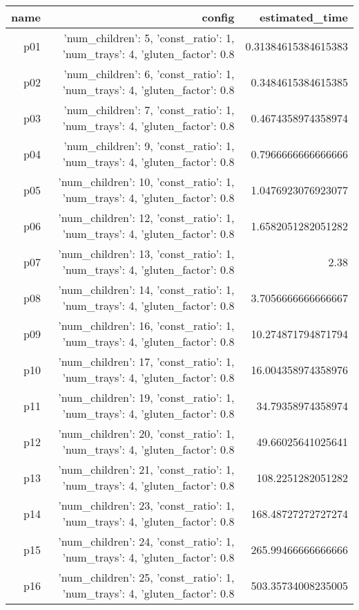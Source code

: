 \documentclass{article}
\begin{document}
                            \begin{center}
                            \scriptsize
                            \begin{tabular}{r|r|r}
                            name & config & estimated\_time\\\midrule
                              p01&{'num\_children': 5, 'const\_ratio': 1, 'num\_trays': 4, 'gluten\_factor': 0.8}&0.31384615384615383\\
  p02&{'num\_children': 6, 'const\_ratio': 1, 'num\_trays': 4, 'gluten\_factor': 0.8}&0.3484615384615385\\
  p03&{'num\_children': 7, 'const\_ratio': 1, 'num\_trays': 4, 'gluten\_factor': 0.8}&0.4674358974358974\\
  p04&{'num\_children': 9, 'const\_ratio': 1, 'num\_trays': 4, 'gluten\_factor': 0.8}&0.7966666666666666\\
  p05&{'num\_children': 10, 'const\_ratio': 1, 'num\_trays': 4, 'gluten\_factor': 0.8}&1.0476923076923077\\
  p06&{'num\_children': 12, 'const\_ratio': 1, 'num\_trays': 4, 'gluten\_factor': 0.8}&1.6582051282051282\\
  p07&{'num\_children': 13, 'const\_ratio': 1, 'num\_trays': 4, 'gluten\_factor': 0.8}&2.38\\
  p08&{'num\_children': 14, 'const\_ratio': 1, 'num\_trays': 4, 'gluten\_factor': 0.8}&3.7056666666666667\\
  p09&{'num\_children': 16, 'const\_ratio': 1, 'num\_trays': 4, 'gluten\_factor': 0.8}&10.274871794871794\\
  p10&{'num\_children': 17, 'const\_ratio': 1, 'num\_trays': 4, 'gluten\_factor': 0.8}&16.004358974358976\\
  p11&{'num\_children': 19, 'const\_ratio': 1, 'num\_trays': 4, 'gluten\_factor': 0.8}&34.79358974358974\\
  p12&{'num\_children': 20, 'const\_ratio': 1, 'num\_trays': 4, 'gluten\_factor': 0.8}&49.66025641025641\\
  p13&{'num\_children': 21, 'const\_ratio': 1, 'num\_trays': 4, 'gluten\_factor': 0.8}&108.2251282051282\\
  p14&{'num\_children': 23, 'const\_ratio': 1, 'num\_trays': 4, 'gluten\_factor': 0.8}&168.48727272727274\\
  p15&{'num\_children': 24, 'const\_ratio': 1, 'num\_trays': 4, 'gluten\_factor': 0.8}&265.99466666666666\\
  p16&{'num\_children': 25, 'const\_ratio': 1, 'num\_trays': 4, 'gluten\_factor': 0.8}&503.35734008235005\\

\end{tabular}
\end{center}
\end{document}

